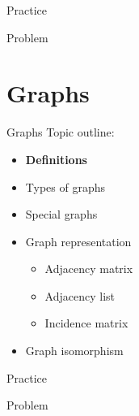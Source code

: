 \documentclass[dvipsnames,t,aspectratio=169]{beamer}
\begin{document}
\begin{frame}{Practice}
	\begin{block}{Problem}
	
	\end{block}
\end{frame}

\section{Graphs}

\begin{frame}{Graphs}
	Topic outline:
	\begin{itemize}
		\item \textbf{Definitions}
		\item Types of graphs
		\item Special graphs
		\item Graph representation
		\begin{itemize}
			\item Adjacency matrix
			\item Adjacency list
			\item Incidence matrix
		\end{itemize}
		\item Graph isomorphism
	\end{itemize}
\end{frame}

\begin{frame}{Practice}
	\begin{block}{Problem}
	
	\end{block}
\end{frame}
\end{document}

